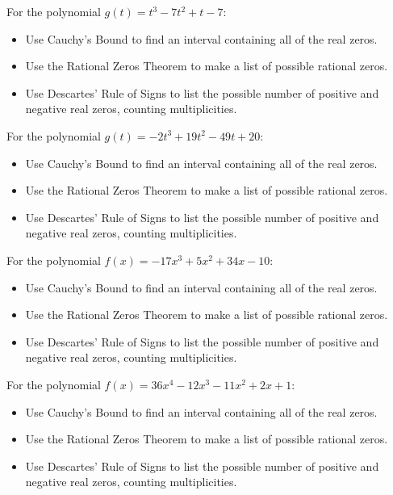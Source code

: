 \documentclass{ximera}
\begin{document}
\begin{problem}
For the polynomial $g(t) = t^{3} - 7t^{2} + t - 7$:

\begin{itemize}
\item  Use Cauchy's Bound to find an interval containing all of the real zeros.
\item  Use the Rational Zeros Theorem to make a list of possible rational zeros.
\item  Use Descartes' Rule of Signs to list the possible number of positive and negative real zeros, counting multiplicities.
\end{itemize}
\end{problem}

\begin{problem}
For the polynomial $g(t) = -2t^{3} + 19t^{2} - 49t + 20$:

\begin{itemize}
\item  Use Cauchy's Bound to find an interval containing all of the real zeros.
\item  Use the Rational Zeros Theorem to make a list of possible rational zeros.
\item  Use Descartes' Rule of Signs to list the possible number of positive and negative real zeros, counting multiplicities.
\end{itemize}
\end{problem}

\begin{problem}
For the polynomial $f(x) = -17x^{3} + 5x^{2} + 34x - 10$:

\begin{itemize}
\item  Use Cauchy's Bound to find an interval containing all of the real zeros.
\item  Use the Rational Zeros Theorem to make a list of possible rational zeros.
\item  Use Descartes' Rule of Signs to list the possible number of positive and negative real zeros, counting multiplicities.
\end{itemize}
\end{problem}

\begin{problem}
For the polynomial $f(x) = 36x^{4} - 12x^{3} - 11x^{2} + 2x + 1$:

\begin{itemize}
\item  Use Cauchy's Bound to find an interval containing all of the real zeros.
\item  Use the Rational Zeros Theorem to make a list of possible rational zeros.
\item  Use Descartes' Rule of Signs to list the possible number of positive and negative real zeros, counting multiplicities.
\end{itemize}
\end{problem}
\end{document}
